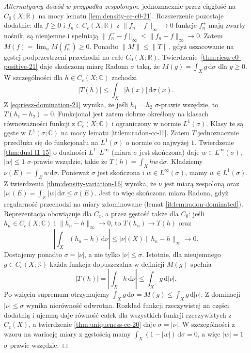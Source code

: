 \begin{proof}[Alternatywny dowód w przypadku zespolonym]
jednoznacznie przez ciągłość na $C_0(X;\mathbb R)$ na mocy
lematu \ref{lem:density-cc-c0-21}. Rozszerzenie pozostaje
dodatnie: dla $f\ge0$ i $f_n\in C_c(X;\mathbb R)$
z $\|f_n-f\|_\infty\to0$ funkcje $f_n^+$ mają zwarty
nośnik, są nieujemne i spełniają
$\|f_n^+-f\|_\infty\le\|f_n-f\|_\infty\to0$.
Zatem $M(f)=\lim_n M(f_n^+)\ge0$.
Ponadto $\|M\|\le\|T\|$, gdyż oszacowanie na gęstej
podprzestrzeni przechodzi na całe $C_0(X;\mathbb R)$.
Twierdzenie~\ref{thm:riesz-c0-positive-21} daje
skończoną miarę Radona $\sigma$ taką, że
$M(g)=\int_Xg\,\mathrm d\sigma$ dla $g\ge0$.
W szczególności dla $h\in C_c(X;\mathbb C)$ zachodzi
\begin{equation}\label{eq:riesz-domination-21}
 |T(h)|\le \int_X|h(x)|\,\mathrm d\sigma(x).
\end{equation}
Z \eqref{eq:riesz-domination-21} wynika, że jeśli $h_1=h_2$
$\sigma$-prawie wszędzie, to $T(h_1-h_2)=0$.
Funkcjonał jest zatem dobrze określony na klasach
równoważności funkcji z $C_c(X;\mathbb C)$ i ograniczony
w normie $L^1(\sigma)$. Klasy te są gęste w
$L^1(\sigma;\mathbb C)$ na mocy lematu
\ref{it:lem:radon-cc-l1}. Zatem $T$ jednoznacznie
przedłuża się do funkcjonału na $L^1(\sigma)$
o normie co najwyżej $1$.
Twierdzenie \ref{thm:dual-l1-15} o dualności
$L^1$--$L^\infty$ (miara $\sigma$ jest skończona) daje $w\in L^\infty(\sigma)$,
$|w|\le1$ $\sigma$-prawie wszędzie, takie że
$T(h)=\int_X h w\,\mathrm d\sigma$.
Kładziemy $\nu(E)=\int_E w\,\mathrm d\sigma$.
Ponieważ $\sigma$ jest skończona i $w\in L^\infty(\sigma)$,
mamy $w\in L^1(\sigma)$. Z twierdzenia \ref{thm:density-variation-16}
wynika, że $\nu$ jest miarą zespoloną oraz
$|\nu|(E)=\int_E|w|\,\mathrm d\sigma\le\sigma(E)$.
Jest to więc skończona miara Radona, gdyż
regularność przechodzi na miary zdominowane (lemat \ref{it:lem:radon-dominated}).
Reprezentacja obowiązuje dla $C_c$, a przez gęstość
także dla $C_0$: jeśli $h_n\in C_c(X;\mathbb C)$
i $\|h_n-h\|_\infty\to0$, to $T(h_n)\to T(h)$
oraz
\[
 \left|\int_X(h_n-h)\,\mathrm d\nu\right|
 \le|\nu|(X)\|h_n-h\|_\infty\longrightarrow0.
\]
Dostajemy ponadto $\sigma=|\nu|$, a nie tylko
$|\nu|\le\sigma$. Istotnie, dla nieujemnego
$g\in C_c(X;\mathbb R)$ każda funkcja dopuszczalna
w definicji $M(g)$ spełnia
\[
 |T(h)|=\left|\int_X h\,\mathrm d\nu\right|
 \le\int_Xg\,\mathrm d|\nu|.
\]
Po wzięciu supremum otrzymujemy
$\int_Xg\,\mathrm d\sigma=M(g)\le\int_Xg\,\mathrm d|\nu|$.
Z dominacji $|\nu|\le\sigma$ wynika nierówność odwrotna.
Rozkład funkcji rzeczywistej na części dodatnią
i ujemną daje równość całek dla wszystkich funkcji
rzeczywistych z $C_c(X)$, a twierdzenie
\ref{thm:uniqueness-cc-20} daje $\sigma=|\nu|$.
W szczególności z wzoru na wariację miary z gęstością
mamy $\int_X(1-|w|)\,\mathrm d\sigma=0$, a więc
$|w|=1$ $\sigma$-prawie wszędzie.


\end{proof}

